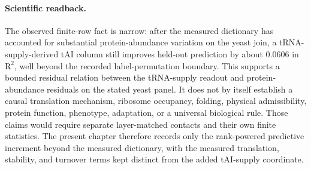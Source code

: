 \paragraph{Scientific readback.}
The observed finite-row fact is narrow: after the measured dictionary has accounted for substantial protein-abundance variation on the yeast join, a tRNA-supply-derived tAI column still improves held-out prediction by about $0.0606$ in $\mathrm{R}^{2}$, well beyond the recorded label-permutation boundary.  This supports a bounded residual relation between the tRNA-supply readout and protein-abundance residuals on the stated yeast panel.  It does not by itself establish a causal translation mechanism, ribosome occupancy, folding, physical admissibility, protein function, phenotype, adaptation, or a universal biological rule.  Those claims would require separate layer-matched contacts and their own finite statistics.  The present chapter therefore records only the rank-powered predictive increment beyond the measured dictionary, with the measured translation, stability, and turnover terms kept distinct from the added tAI-supply coordinate.